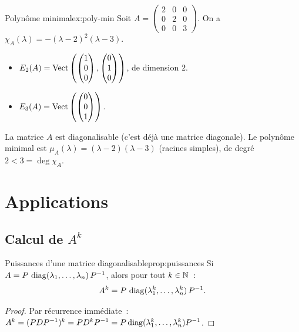 \begin{example}{Polynôme minimal}{ex:poly-min}
  Soit $A=\begin{pmatrix}2&0&0\\0&2&0\\0&0&3\end{pmatrix}$. On a
  $\chi_A(\lambda)=-(\lambda-2)^2(\lambda-3)$.

  \begin{itemize}
    \item $E_2(A)=\operatorname{Vect}\left(\begin{pmatrix}1\\0\\0\end{pmatrix},
      \begin{pmatrix}0\\1\\0\end{pmatrix}\right)$, de dimension $2$.
    \item $E_3(A)=\operatorname{Vect}\left(\begin{pmatrix}0\\0\\1\end{pmatrix}\right)$.
  \end{itemize}
  La matrice $A$ est diagonalisable (c'est déjà une matrice diagonale).
  Le polynôme minimal est $\mu_A(\lambda)=(\lambda-2)(\lambda-3)$
  (racines simples), de degré~$2<3=\deg\chi_A$.
\end{example}

\section{Applications}\label{sec:applications-vp}

\subsection{Calcul de $A^k$}\label{subsec:puissances}

\begin{proposition}{Puissances d'une matrice diagonalisable}{prop:puissances}
  Si $A=P\,\operatorname{diag}(\lambda_1,\ldots,\lambda_n)\,{P}^{-1}$, alors pour
  tout $k\in{\mathbb{N}}$~:
  \[
    A^k=P\,\operatorname{diag}(\lambda_1^k,\ldots,\lambda_n^k)\,{P}^{-1}.
  \]
\end{proposition}

\begin{proof}
  Par récurrence immédiate~:
  $A^k=(P D{P}^{-1})^k=P D^k{P}^{-1}=P\operatorname{diag}(\lambda_1^k,\ldots,
  \lambda_n^k){P}^{-1}$.
\end{proof}

